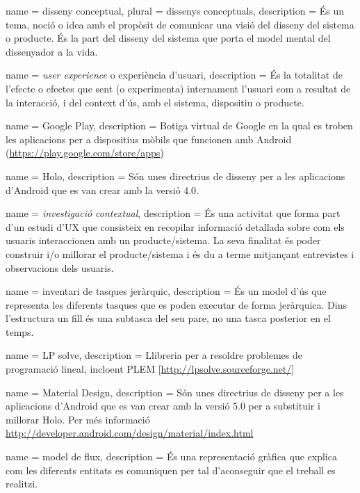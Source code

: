 {
name = disseny conceptual, plural = dissenys conceptuals, description = {És un tema, noció o idea amb el propòsit de comunicar una visió del disseny del sistema o producte. És la part del disseny del sistema que porta el model mental del dissenyador a la vida.}
}

{
name = \textit{user experience} o experiència d'usuari, description = {És la totalitat de l'efecte o efectes que sent (o experimenta) internament l'usuari com a resultat de la interacció, i del context d'ús, amb el sistema, dispositiu o producte.}
}

{
name = Google Play, description = {Botiga virtual de Google en la qual es troben les aplicacions per a dispositius mòbils que funcionen amb \gls{Android} (\url{https://play.google.com/store/apps})}
}

{
name = Holo, description = {Són unes directrius de disseny per a les aplicacions d'\gls{Android} que es van crear amb la versió 4.0.}
}

{
name = \textit{investigació contextual}, description = {És una activitat que forma part d'un estudi d'UX que consisteix en recopilar informació detallada sobre com els usuaris interaccionen amb un producte/sistema. La seva finalitat és poder construir i/o millorar el producte/sistema i és du a terme mitjançant entrevistes i observacions dels usuaris.}
}

{
name = inventari de tasques jeràrquic, description = {És un model d'ús que representa les diferents tasques que es poden executar de forma jeràrquica. Dins l'estructura un fill és una subtasca del seu pare, no una tasca posterior en el temps.}
}

{
name = LP solve, description = {Llibreria per a resoldre problemes de programació lineal, incloent PLEM [\url{http://lpsolve.sourceforge.net/}]}
}

{
name = Material Design, description = {Són unes directrius de disseny per a les aplicacions d'Android que es van crear amb la versió 5.0 per a substituir i millorar Holo. Per més informació \url{http://developer.android.com/design/material/index.html}}
}

{
name = model de flux, description = {És una representació gràfica que explica com les diferents entitats es comuniquen per tal d'aconseguir que el treball es realitzi.}
}

